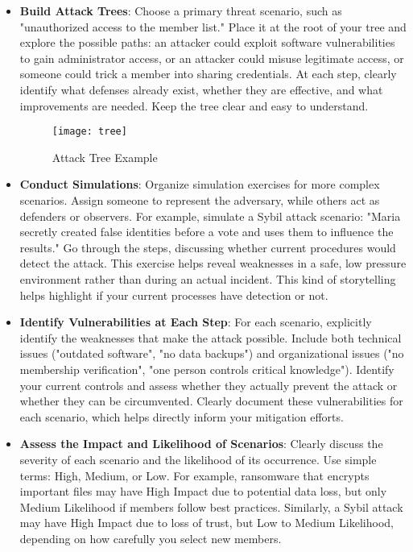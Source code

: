 \begin{itemize}

    \item \textbf{Build Attack Trees}: Choose a primary threat scenario, such as
    "unauthorized access to the member list." Place it at the root of your tree and
    explore the possible paths: an attacker could exploit software vulnerabilities
    to gain administrator access, or an attacker could misuse legitimate access, or
    someone could trick a member into sharing credentials. At each step, clearly
    identify what defenses already exist, whether they are effective, and what
    improvements are needed. Keep the tree clear and easy to understand.

    \begin{figure}[htbp]
        \centering
        \texttt{[image: tree]}
        \caption{Attack Tree Example}
        \label{fig:attack_tree_example}
    \end{figure}

    \item \textbf{Conduct Simulations}: Organize simulation exercises for
    more complex scenarios. Assign someone to represent the adversary, while others
    act as defenders or observers. For example, simulate a Sybil attack scenario:
    "Maria secretly created false identities before a vote and uses them to
    influence the results." Go through the steps, discussing whether current
    procedures would detect the attack. This exercise helps reveal weaknesses in a
    safe, low pressure environment rather than during an actual incident.
    This kind of storytelling helps highlight if your current processes have detection or not.

    \item \textbf{Identify Vulnerabilities at Each Step}: For each scenario,
    explicitly identify the weaknesses that make the attack possible. Include both
    technical issues ("outdated software", "no data backups") and organizational
    issues ("no membership verification", "one person controls critical knowledge").
    Identify your current controls and assess whether they actually prevent the
    attack or whether they can be circumvented. Clearly document these
    vulnerabilities for each scenario, which helps directly inform your mitigation
    efforts.

    \item \textbf{Assess the Impact and Likelihood of Scenarios}: Clearly discuss
    the severity of each scenario and the likelihood of its occurrence. Use simple
    terms: High, Medium, or Low. For example, ransomware that encrypts
    important files may have High Impact due to potential data loss, but only
    Medium Likelihood if members follow best practices. Similarly, a Sybil attack
    may have High Impact due to loss of trust, but Low to Medium Likelihood,
    depending on how carefully you select new members.


\end{itemize}
